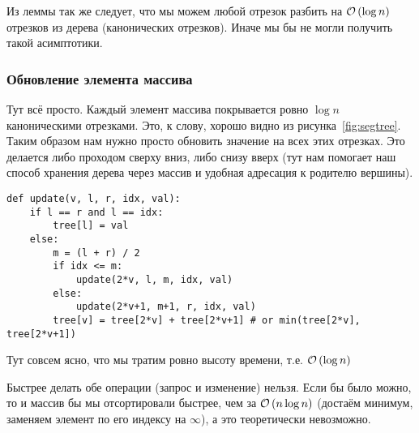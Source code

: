\begin{note}
Из леммы так же следует, что мы можем любой отрезок разбить на $\mathcal{O}\left(\log{n}\right)$ отрезков из дерева (канонических отрезков). Иначе мы бы не могли получить такой асимптотики.
\end{note}
\subsubsection{Обновление элемента массива}
Тут всё просто. Каждый элемент массива покрывается ровно $\log{n}$ каноническими отрезками. Это, к слову, хорошо видно из рисунка~\ref{fig:segtree}. Таким образом нам нужно просто обновить значение на всех этих отрезках. Это делается либо проходом сверху вниз, либо снизу вверх (тут нам помогает наш способ хранения дерева через массив и удобная адресация к родителю вершины).
\begin{verbatim}
def update(v, l, r, idx, val):
    if l == r and l == idx:
        tree[l] = val
    else:
        m = (l + r) / 2
        if idx <= m:
            update(2*v, l, m, idx, val)
        else:
            update(2*v+1, m+1, r, idx, val)
        tree[v] = tree[2*v] + tree[2*v+1] # or min(tree[2*v], tree[2*v+1])
\end{verbatim}
Тут совсем ясно, что мы тратим ровно высоту времени, т.е. $\mathcal{O}\left(\log{n}\right)$
\begin{note}
Быстрее делать обе операции (запрос и изменение) нельзя. Если бы было можно, то и массив бы мы отсортировали быстрее, чем за $\mathcal{O}\left(n\log{n}\right)$ (достаём минимум, заменяем элемент по его индексу на $\infty$), а это теоретически невозможно.
\end{note}

